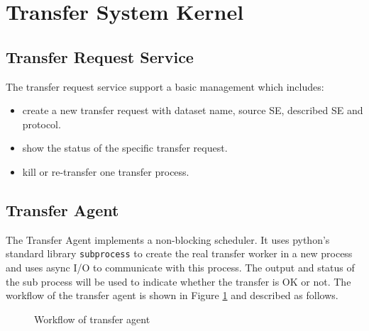 \section{Transfer System Kernel}

\subsection{Transfer Request Service}

The transfer request service support a basic management which includes:
\begin{itemize}
    \item create a new transfer request with dataset name,
          source SE, described SE and protocol.
    \item show the status of the specific transfer request.
    \item kill or re-transfer one transfer process.
\end{itemize}
%
\subsection{Transfer Agent}
%
The Transfer Agent implements a non-blocking scheduler.
It uses python's standard library {\tt subprocess} to 
create the real transfer worker in a new process
and uses async I/O to communicate with this process.
The output and status of the sub process will be used 
to indicate whether the transfer is OK or not.
%
The workflow of the transfer agent is shown in Figure \ref{fig:agent}
and described as follows.
\begin{figure}
    
    \caption{Workflow of transfer agent} \label{fig:agent}
\end{figure}

